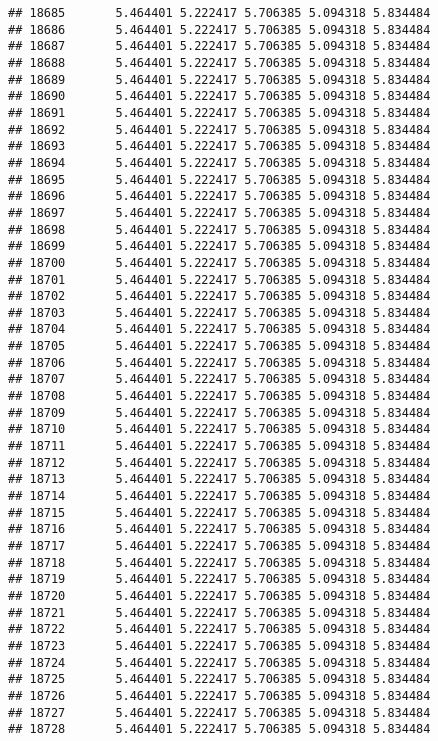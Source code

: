 \documentclass[
]{article}
\begin{document}
\begin{verbatim}
## 18685       5.464401 5.222417 5.706385 5.094318 5.834484
## 18686       5.464401 5.222417 5.706385 5.094318 5.834484
## 18687       5.464401 5.222417 5.706385 5.094318 5.834484
## 18688       5.464401 5.222417 5.706385 5.094318 5.834484
## 18689       5.464401 5.222417 5.706385 5.094318 5.834484
## 18690       5.464401 5.222417 5.706385 5.094318 5.834484
## 18691       5.464401 5.222417 5.706385 5.094318 5.834484
## 18692       5.464401 5.222417 5.706385 5.094318 5.834484
## 18693       5.464401 5.222417 5.706385 5.094318 5.834484
## 18694       5.464401 5.222417 5.706385 5.094318 5.834484
## 18695       5.464401 5.222417 5.706385 5.094318 5.834484
## 18696       5.464401 5.222417 5.706385 5.094318 5.834484
## 18697       5.464401 5.222417 5.706385 5.094318 5.834484
## 18698       5.464401 5.222417 5.706385 5.094318 5.834484
## 18699       5.464401 5.222417 5.706385 5.094318 5.834484
## 18700       5.464401 5.222417 5.706385 5.094318 5.834484
## 18701       5.464401 5.222417 5.706385 5.094318 5.834484
## 18702       5.464401 5.222417 5.706385 5.094318 5.834484
## 18703       5.464401 5.222417 5.706385 5.094318 5.834484
## 18704       5.464401 5.222417 5.706385 5.094318 5.834484
## 18705       5.464401 5.222417 5.706385 5.094318 5.834484
## 18706       5.464401 5.222417 5.706385 5.094318 5.834484
## 18707       5.464401 5.222417 5.706385 5.094318 5.834484
## 18708       5.464401 5.222417 5.706385 5.094318 5.834484
## 18709       5.464401 5.222417 5.706385 5.094318 5.834484
## 18710       5.464401 5.222417 5.706385 5.094318 5.834484
## 18711       5.464401 5.222417 5.706385 5.094318 5.834484
## 18712       5.464401 5.222417 5.706385 5.094318 5.834484
## 18713       5.464401 5.222417 5.706385 5.094318 5.834484
## 18714       5.464401 5.222417 5.706385 5.094318 5.834484
## 18715       5.464401 5.222417 5.706385 5.094318 5.834484
## 18716       5.464401 5.222417 5.706385 5.094318 5.834484
## 18717       5.464401 5.222417 5.706385 5.094318 5.834484
## 18718       5.464401 5.222417 5.706385 5.094318 5.834484
## 18719       5.464401 5.222417 5.706385 5.094318 5.834484
## 18720       5.464401 5.222417 5.706385 5.094318 5.834484
## 18721       5.464401 5.222417 5.706385 5.094318 5.834484
## 18722       5.464401 5.222417 5.706385 5.094318 5.834484
## 18723       5.464401 5.222417 5.706385 5.094318 5.834484
## 18724       5.464401 5.222417 5.706385 5.094318 5.834484
## 18725       5.464401 5.222417 5.706385 5.094318 5.834484
## 18726       5.464401 5.222417 5.706385 5.094318 5.834484
## 18727       5.464401 5.222417 5.706385 5.094318 5.834484
## 18728       5.464401 5.222417 5.706385 5.094318 5.834484

\end{verbatim}
\end{document}
